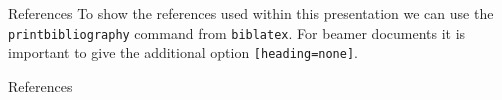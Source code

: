 \begin{frame}{References}
  To show the references used within this presentation we can use the
  \texttt{printbibliography} command from \texttt{biblatex}. For
  beamer documents it is important to give the additional option
  \texttt{[heading=none]}.
  \begin{block}{References}
    \printbibliography[heading=none]
  \end{block}
\end{frame}
%
